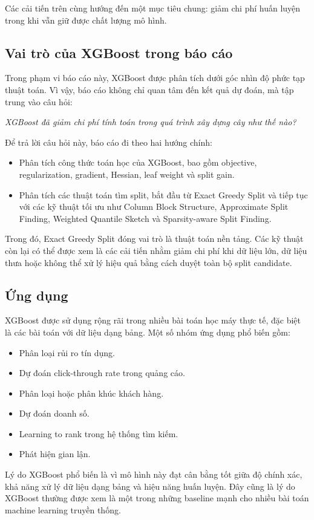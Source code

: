 Các cải tiến trên cùng hướng đến một mục tiêu chung: giảm chi phí huấn luyện trong khi vẫn giữ được chất lượng mô hình.

\subsection{Vai trò của XGBoost trong báo cáo}

Trong phạm vi báo cáo này, XGBoost được phân tích dưới góc nhìn độ phức tạp thuật toán. Vì vậy, báo cáo không chỉ quan tâm đến kết quả dự đoán, mà tập trung vào câu hỏi:

\begin{center}
\textit{XGBoost đã giảm chi phí tính toán trong quá trình xây dựng cây như thế nào?}
\end{center}

Để trả lời câu hỏi này, báo cáo đi theo hai hướng chính:

\begin{itemize}
    \item Phân tích công thức toán học của XGBoost, bao gồm objective, regularization, gradient, Hessian, leaf weight và split gain.
    \item Phân tích các thuật toán tìm split, bắt đầu từ Exact Greedy Split và tiếp tục với các kỹ thuật tối ưu như Column Block Structure, Approximate Split Finding, Weighted Quantile Sketch và Sparsity-aware Split Finding.
\end{itemize}

Trong đó, Exact Greedy Split đóng vai trò là thuật toán nền tảng. Các kỹ thuật còn lại có thể được xem là các cải tiến nhằm giảm chi phí khi dữ liệu lớn, dữ liệu thưa hoặc không thể xử lý hiệu quả bằng cách duyệt toàn bộ split candidate.

\subsection{Ứng dụng}

XGBoost được sử dụng rộng rãi trong nhiều bài toán học máy thực tế, đặc biệt là các bài toán với dữ liệu dạng bảng. Một số nhóm ứng dụng phổ biến gồm:

\begin{itemize}
    \item Phân loại rủi ro tín dụng.
    \item Dự đoán click-through rate trong quảng cáo.
    \item Phân loại hoặc phân khúc khách hàng.
    \item Dự đoán doanh số.
    \item Learning to rank trong hệ thống tìm kiếm.
    \item Phát hiện gian lận.
\end{itemize}

Lý do XGBoost phổ biến là vì mô hình này đạt cân bằng tốt giữa độ chính xác, khả năng xử lý dữ liệu dạng bảng và hiệu năng huấn luyện. Đây cũng là lý do XGBoost thường được xem là một trong những baseline mạnh cho nhiều bài toán machine learning truyền thống.